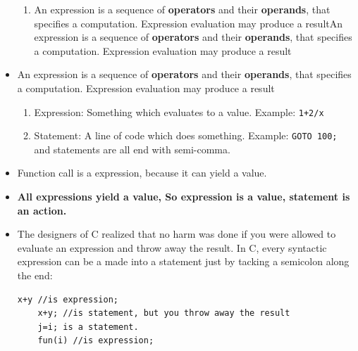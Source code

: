 \documentclass[a4paper,11pt,twoside]{book}
\begin{document}
\begin{itemize}
\begin{enumerate}
		\item An expression is a sequence of \textbf{operators} and their \textbf{operands}, that specifies a computation. Expression evaluation may produce a resultAn expression is a sequence of \textbf{operators} and their \textbf{operands}, that specifies a computation. Expression evaluation may produce a result
	\end{enumerate}
	\item An expression is a sequence of \textbf{operators} and their \textbf{operands}, that specifies a computation. Expression evaluation may produce a result
	
	\begin{enumerate}
		\item Expression: Something which evaluates to a value. Example: \texttt{1+2/x}
		\item Statement: A line of code which does something. Example: \texttt{GOTO 100;} and statements are all end with semi-comma.
	\end{enumerate}
	
	\item Function call is a expression, because it can yield a value.
	
	\item \textbf{All expressions yield a value, So expression is a value, statement is an action.}
	
	
	\item The designers of C realized that no harm was done if you were allowed to evaluate an expression and throw away the result. In C, every syntactic expression can be a made into a statement just by tacking a semicolon along the end:
	
	\begin{lstlisting}[numbers=none]
	x+y //is expression;
	x+y; //is statement, but you throw away the result
	j=i; is a statement.
	fun(i) //is expression;
	\end{lstlisting}
	
\end{itemize}
\end{document}
